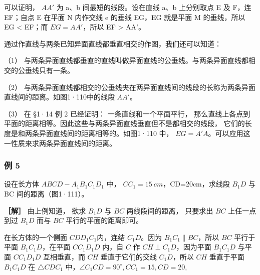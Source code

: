 可以证明， \(AA'\) 为 a、b 间最短的线段。设在直线 a、b 上分别取点 E 及
F，连 EF；自点 E 在平面 N 内作交线 e 的垂线 EG，EG 就是平面 M
的垂线，所以 EG \textless{} EF；而 \(EG = AA'\)，所以 EF \textgreater{}
AA'。

通过作直线与两条已知异面直线都垂直相交的作图，我们还可以知道：

（1）
与两条异面直线都垂直的直线叫做异面直线的公垂线。与两条异面直线都相交的公垂线只有一条。

（2）
与两条异面直线都相交的公垂线夹在两异面直线间的线段的长称为两条异面直线间的距离。如图1·110中的线段
\(AA'\)。

（3） 在 §1·14 例 2 已经证明： 一条直线和一个平面平行，
那么直线上各点到平面的距离相等。因此这些与两条异面直线垂直但不是都相交的线段，
它们的长度是和两条异面直线间的距离相等的。如图1·110 中，
\(EG = A'A\)。可以应用这一性质来求两条异面直线间的距离。

\subsubsection{例 5}

设在长方体 \(ABCD-A_{1}B_{1}C_{1}D_{1}\) 中，
\(CC_{1}=15\ cm\)，CD=20cm，求线段 \(B_{1}D\) 与 BC
间的距离（图1·111）。

\textbf{［解］} 由上例知道， 欲求 \(B_{1}D\) 与 \(BC\) 两线段间的距离，
只要求出 \(BC\) 上任一点到过 \(B_{1}D\) 而与 \(BC\)
平行的平面的距离即可。

在长方体的一个侧面 \(CDD_{1}C_{1}\)内，连结 \(C_1D\)。因为
\(B_1C_1 \parallel BC\)，所以 \(BC\) 平行于平面 \(B_1C_1D\)，在平面
\(CC_1D_1D\) 内，自 \(C\) 作 \(CH \perp C_1D\)，因为平面 \(B_1C_1D\)
与平面 \(CC_1D_1D\) 互相垂直，而 \(CH\) 垂直于它们的交线 \(C_1D\)，所以
\(CH\) 垂直于平面 \(B_1C_1D\) 在 \(\triangle CDC_1\)
中，\(\angle C_1CD = 90^\circ, CC_1 = 15, CD = 20,\)

